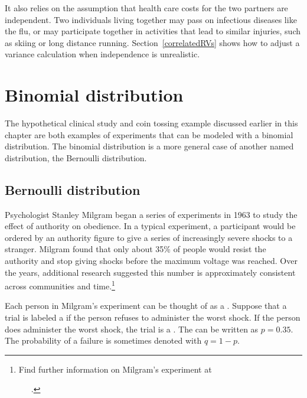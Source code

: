 It also relies on the assumption that health care costs for the two partners are independent.  Two individuals living together may pass on infectious diseases like the flu, or may participate together in activities that lead to similar injuries, such as skiing or long distance running.  Section~\ref{correlatedRVs} shows how to adjust a variance calculation when independence is unrealistic.



\newpage

\section{Binomial distribution}
\label{binomialModel}

The hypothetical clinical study and coin tossing example discussed earlier in this chapter are both examples of experiments that can be modeled with a binomial distribution. The binomial distribution is a more general case of another named distribution, the Bernoulli distribution.


\subsection{Bernoulli distribution}
\label{bernoulli}


Psychologist Stanley Milgram began a series of experiments in 1963 to study the effect of authority on obedience. In a typical experiment, a participant would be ordered by an authority figure to give a series of increasingly severe shocks to a stranger. Milgram found that only about 35\% of people would resist the authority and stop giving shocks before the maximum voltage was reached. Over the years, additional research suggested this number is approximately consistent across communities and time.\footnote{Find further information on Milgram's experiment at \par \ \ \hspace{0.2mm}\ .}

Each person in Milgram's experiment can be thought of as a . Suppose that a trial is labeled a  if the person refuses to administer the worst shock. If the person does administer the worst shock, the trial is a . The  can be written as $p=0.35$. The probability of a failure is sometimes denoted with $q=1-p$.

